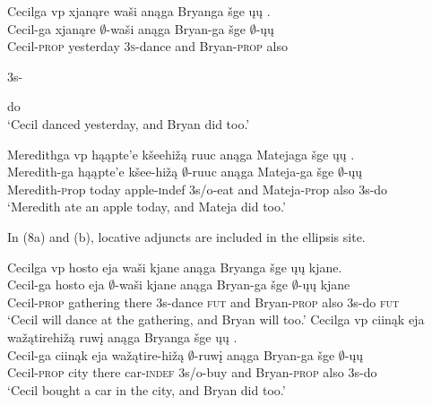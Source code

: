 \documentclass[output=paper]{LSP/langsci}
\begin{document}
\begin{exe}
\ex
\begin{xlist}
\ex
\glll Cecilga {\ob}{vp} xjanąre waši{\cb} anąga Bryanga šge {\ob}ųų{\cb} .\\
Cecil-ga {} xjanąre $\emptyset$-waši anąga Bryan-ga šge $\emptyset$-ųų\\
Cecil-\textsc{prop} {} yesterday \textsc{3s}-dance and Bryan-\textsc{prop} also \begin{sc}3s-\end{sc}do\\
\trans `Cecil danced yesterday, and Bryan did too.'

\ex
\glll Meredithga  {\ob}{vp} hąąpte'e kšeehižą ruuc{\cb} anąga Matejaga šge {\ob}ųų{\cb} .\\
Meredith-ga {} hąąpte'e kšee-hižą $\emptyset$-ruuc anąga Mateja-ga šge $\emptyset$-ųų\\
Meredith-{\textsc prop} {} today apple-{\textsc indef} {\textsc 3s/o}-eat and Mateja-{\textsc prop} also {\textsc 3s}-do\\
\trans `Meredith ate an apple today, and Mateja did too.'
\end{xlist}
\end{exe}

In (8a) and (b), locative adjuncts are included in the ellipsis site. 

\begin{exe}
\ex
\begin{xlist}
\ex
\glll Cecilga {\ob}{vp} hosto eja waši{\cb} kjane anąga Bryanga šge {\ob}ųų{\cb} kjane.\\
Cecil-ga {} hosto eja $\emptyset$-waši kjane anąga Bryan-ga šge $\emptyset$-ųų kjane\\
Cecil-\textsc{prop} {} gathering there {\textsc 3s}-dance \textsc{fut} and Bryan-\textsc{prop} also {\textsc 3s}-do \textsc{fut}\\
\trans `Cecil will dance at the gathering, and Bryan will too.'
\ex
\glll Cecilga {\ob}{vp} ciinąk eja wažątirehižą ruwį{\cb} anąga Bryanga šge {\ob}ųų{\cb} .\\
Cecil-ga {} ciinąk eja wažątire-hižą $\emptyset$-ruwį anąga Bryan-ga šge $\emptyset$-ųų\\
Cecil-\textsc{prop} {} city there car-\textsc{indef} {\textsc 3s/o}-buy and Bryan-\textsc{prop} also {\textsc 3s}-do\\
\trans `Cecil bought a car in the city, and Bryan did too.'
\end{xlist}
\end{exe}
\end{document}
